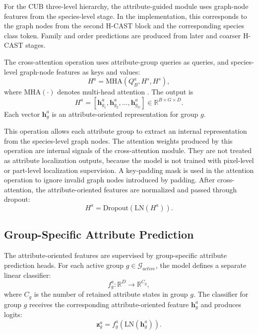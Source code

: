 For the CUB three-level hierarchy, the attribute-guided module uses graph-node features from the species-level stage. In the implementation, this corresponds to the graph nodes from the second H-CAST block and the corresponding species class token. Family and order predictions are produced from later and coarser H-CAST stages.

The cross-attention operation uses attribute-group queries as queries, and species-level graph-node features as keys and values:
\begin{equation}
    H^{a}
    =
    \mathrm{MHA}
    \left(
        Q^{a}_{B},
        H^{s},
        H^{s}
    \right),
\end{equation}
where \(\mathrm{MHA}(\cdot)\) denotes multi-head attention \cite{vaswani2017attention}. The output is
\begin{equation}
    H^{a}
    =
    [\mathbf{h}^{a}_{g_1}, \mathbf{h}^{a}_{g_2}, \ldots, \mathbf{h}^{a}_{g_G}]
    \in
    \mathbb{R}^{B \times G \times D}.
\end{equation}
Each vector \(\mathbf{h}^{a}_{g}\) is an attribute-oriented representation for group \(g\).

This operation allows each attribute group to extract an internal representation from the species-level graph nodes. The attention weights produced by this operation are internal signals of the cross-attention module. They are not treated as attribute localization outputs, because the model is not trained with pixel-level or part-level localization supervision.
A key-padding mask is used in the attention operation to ignore invalid graph nodes introduced by padding. After cross-attention, the attribute-oriented features are normalized and passed through dropout:
\begin{equation}
    H^{a}
    =
    \mathrm{Dropout}
    \left(
        \mathrm{LN}(H^{a})
    \right).
\end{equation}

\subsection{Group-Specific Attribute Prediction}

The attribute-oriented features are supervised by group-specific attribute prediction heads. For each active group \(g \in \mathcal{G}_{active}\), the model defines a separate linear classifier:
\begin{equation}
    f_g^{a}: \mathbb{R}^{D} \rightarrow \mathbb{R}^{C_g},
\end{equation}
where \(C_g\) is the number of retained attribute states in group \(g\). The classifier for group \(g\) receives the corresponding attribute-oriented feature \(\mathbf{h}^{a}_{g}\) and produces logits:
\begin{equation}
    \mathbf{z}^{a}_{g}
    =
    f_g^{a}
    \left(
        \mathrm{LN}(\mathbf{h}^{a}_{g})
    \right).
\end{equation}

